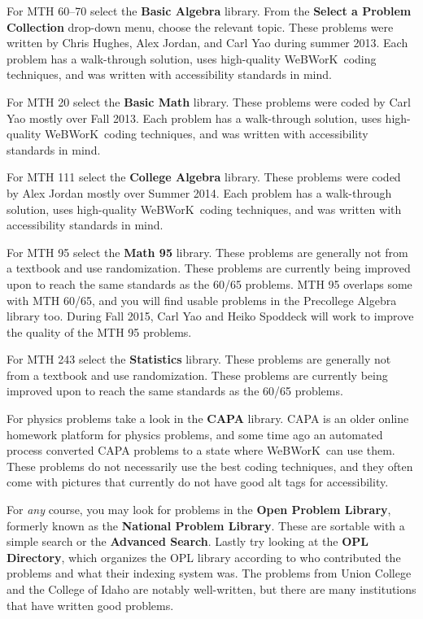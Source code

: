 \documentclass[12pt]{article}
\newcommand{\menu}[1]{\textbf{#1}}
\newcommand{\WW}{WeBWorK}
\begin{document}
\begin{description}
	\item{For MTH 60--70} select the \menu{Basic Algebra} library.
	      From the \menu{Select a Problem Collection} drop-down menu, choose the relevant topic.
	      These problems were written by Chris Hughes, Alex Jordan, and Carl Yao during summer 2013.
	      Each problem has a walk-through solution, uses high-quality \WW\ coding techniques, and was written with accessibility standards in mind.

	\item{For MTH 20} select the \menu{Basic Math} library.
	      These problems were coded by Carl Yao mostly over Fall 2013.
	      Each problem has a walk-through solution, uses high-quality \WW\ coding techniques, and was written with accessibility standards in mind.

	\item{For MTH 111} select the \menu{College Algebra} library.
	      These problems were coded by Alex Jordan mostly over Summer 2014.
	      Each problem has a walk-through solution, uses high-quality \WW\ coding techniques, and was written with accessibility standards in mind.

	\item{For MTH 95} select the \menu{Math 95} library.
	      These problems are generally not from a textbook and use randomization.
	      These problems are currently being improved upon to reach the same standards as the 60/65 problems.
	      MTH 95 overlaps some with MTH 60/65, and you will find usable problems in the Precollege Algebra library too.
	      During Fall 2015, Carl Yao and Heiko Spoddeck will work to improve the quality of the MTH 95 problems.

	\item{For MTH 243} select the \menu{Statistics} library.
	      These problems are generally not from a textbook and use randomization.
	      These problems are currently being improved upon to reach the same standards as the 60/65 problems.

	\item{For physics problems} take a look in the \menu{CAPA} library.
	      CAPA is an older online homework platform for physics problems, and some time ago an automated process converted CAPA problems to a state where \WW\ can use them.
	      These problems do not necessarily use the best coding techniques, and they often come with pictures that currently do not have good alt tags for accessibility.

	\item{For \emph{any} course,} you may look for problems in the \menu{Open Problem Library}, formerly known as the \menu{National Problem Library}.
	      These are sortable with a simple search or the \menu{Advanced Search}.
	      Lastly try looking at the \menu{OPL Directory}, which organizes the OPL library according to who contributed the problems and what their indexing system was.
	      The problems from Union College and the College of Idaho are notably well-written, but there are many institutions that have written good problems.
\end{description}
\end{document}
